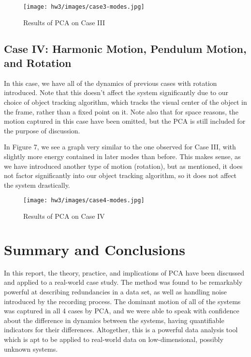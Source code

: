 \documentclass[a4paper,10 pt]{article}
\begin{document}
\begin{figure}[H]
  \centering
    \texttt{[image: hw3/images/case3-modes.jpg]}
    \caption{Results of PCA on Case III}
\end{figure}

\subsection{Case IV: Harmonic Motion, Pendulum Motion, and Rotation}
In this case, we have all of the dynamics of previous cases with rotation introduced. Note that this doesn't affect the system significantly due to our choice of object tracking algorithm, which tracks the visual center of the object in the frame, rather than a fixed point on it. Note also that for space reasons, the motion captured in this case have been omitted, but the PCA is still included for the purpose of discussion.

In Figure 7, we see a graph very similar to the one observed for Case III, with slightly more energy contained in later modes than before. This makes sense, as we have introduced another type of motion (rotation), but as mentioned, it does not factor significantly into our object tracking algorithm, so it does not affect the system drastically.
\begin{figure}[H]
  \centering
    \texttt{[image: hw3/images/case4-modes.jpg]}
    \caption{Results of PCA on Case IV}
\end{figure}

\section{Summary and Conclusions}
In this report, the theory, practice, and implications of PCA have been discussed and applied to a real-world case study. The method was found to be remarkably powerful at describing redundancies in a data set, as well as handling noise introduced by the recording process. The dominant motion of all of the systems was captured in all 4 cases by PCA, and we were able to speak with confidence about the difference in dynamics between the systems, having quantifiable indicators for their differences. Altogether, this is a powerful data analysis tool which is apt to be applied to real-world data on low-dimensional, possibly unknown systems.
\end{document}
